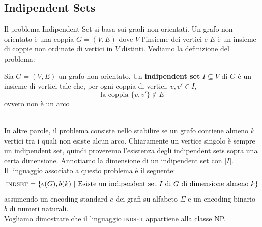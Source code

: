 \subsection{Indipendent Sets}
Il problema Indipendent Set si basa sui gradi non orientati. Un grafo non orientato è una coppia $G = (V,E)$
dove $V$ l'insieme dei vertici e $E$ è un insieme di coppie non ordinate di vertici in $V$ distinti. 
Vediamo la definizione del problema:\smallskip\\
\colorbox{SALZO}{\parbox{\dimexpr\linewidth-2\fboxsep}{\begin{definition}
   Sia $G = (V,E)$ un grafo non orientato. Un \textbf{indipendent set} $I \subseteq V$ di $G$ è un insieme 
   di vertici tale che, per ogni coppia di vertici, $v, v' \in I$,
   \[   \text{la coppia }  \{ v,v'  \} \notin E \]  
   ovvero non è un arco
\end{definition}}}\smallskip\\
In altre parole, il problema consiste nello
stabilire se un grafo contiene almeno $k$
vertici tra i quali non esiste alcun arco.
Chiaramente un vertice singolo è sempre un indipendent set, quindi proveremo l'esistenza degli indipendent sets 
sopra una certa dimensione. Annotiamo la dimensione di un indipendent set con $|I|$.\smallskip\\
Il linguaggio associato a questo problema è il seguente:
\[   \textsc{indset} = \{  e(G), b(k) \ | \ \text{Esiste un indipendent set } I \text{ di } G \text{ di dimensione almeno } k     \}    \]
assumendo un encoding standard $e$ dei grafi su alfabeto $\Sigma$ e un encoding binario $b$ di numeri naturali.\\
Vogliamo dimostrare che il linguaggio \textsc{indset} appartiene alla classe NP.
